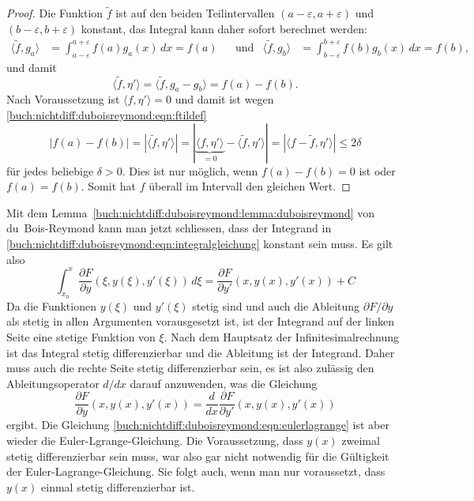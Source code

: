 \begin{proof}
Die Funktion $\tilde{f}$ ist auf den beiden Teilintervallen
$(a-\varepsilon,a+\varepsilon)$ und $(b-\varepsilon,b+\varepsilon)$
konstant, das Integral kann daher sofort berechnet werden:
\begin{align*}
\langle \tilde{f},g_a\rangle
&=
\int_{a-\varepsilon}^{a+\varepsilon}
f(a) g_a(x)
\,dx
=
f(a)
&&\text{und}&
\langle \tilde{f},g_b\rangle
&=
\int_{b-\varepsilon}^{b+\varepsilon}
f(b) g_b(x)
\,dx
=
f(b),
\end{align*}
und damit
\[
\langle \tilde{f},\eta'\rangle
=
\langle \tilde{f},g_a-g_b\rangle
=
f(a)-f(b).
\]
Nach Voraussetzung ist $\langle f,\eta'\rangle=0$ und damit ist
wegen \eqref{buch:nichtdiff:duboisreymond:eqn:ftildef}
\[
|f(a)-f(b)|
=
|\langle\tilde{f},\eta'\rangle|
=
|
\underbrace{\langle f,\eta'\rangle}_{\displaystyle =0}
-
\langle \tilde{f},\eta'\rangle
|
=
|\langle f-\tilde{f},\eta'\rangle|
\le
2\delta
\]
für jedes beliebige $\delta > 0$.
Dies ist nur möglich, wenn $f(a)-f(b)=0$ ist oder $f(a)=f(b)$.
Somit hat $f$ überall im Intervall den gleichen Wert.
\end{proof}

Mit dem Lemma~\ref{buch:nichtdiff:duboisreymond:lemma:duboisreymond}
von du~Bois-Reymond kann man jetzt schliessen, dass der Integrand in
\eqref{buch:nichtdiff:duboisreymond:eqn:integralgleichung}
konstant sein muss.
Es gilt also
\begin{equation}
\int_{x_0}^x\frac{\partial F}{\partial y}(\xi, y(\xi),y'(\xi))
\,d\xi
=
\frac{\partial F}{\partial y'}(x,y(x),y'(x))
+
C
\label{buch:nichtdiff:duboisreymond:gleichung}
\end{equation}
Da die Funktionen $y(\xi)$ und $y'(\xi)$ stetig sind und auch
die Ableitung $\partial F/\partial y$ als stetig in allen Argumenten
vorausgesetzt ist, ist der Integrand auf der linken Seite eine
stetige Funktion von $\xi$.
Nach dem Hauptsatz der Infinitesimalrechnung ist das Integral
stetig differenzierbar und die Ableitung ist der Integrand.
Daher muss auch die rechte Seite stetig differenzierbar sein,
es ist also zulässig den Ableitungsoperator $d/dx$ darauf anzuwenden,
was die Gleichung
\begin{equation}
\frac{\partial F}{\partial y}(x,y(x),y'(x))
=
\frac{d}{dx}
\frac{\partial F}{\partial y'}(x,y(x),y'(x))
\label{buch:nichtdiff:duboisreymond:eqn:eulerlagrange}
\end{equation}
ergibt.
Die Gleichung
\eqref{buch:nichtdiff:duboisreymond:eqn:eulerlagrange}
ist aber wieder die Euler-Lgrange-Gleichung.
Die Voraussetzung, dass $y(x)$ zweimal stetig differenzierbar sein
muss, war also gar nicht notwendig für die Gültigkeit der
Euler-Lagrange-Gleichung.
Sie folgt auch, wenn man nur voraussetzt, dass $y(x)$ einmal stetig
differenzierbar ist.

